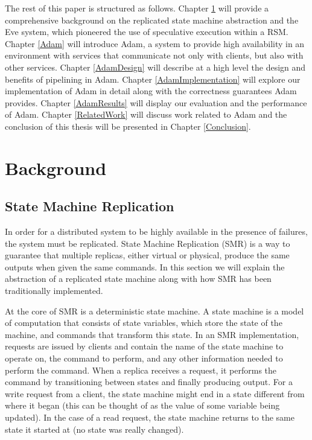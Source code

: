 \documentclass[11pt, oneside]{report}
\begin{document}
The rest of this paper is structured as follows. Chapter \ref{Background} will provide a comprehensive background on the replicated state machine abstraction and the Eve system, which pioneered the use of speculative execution within a RSM. Chapter \ref{Adam} will introduce Adam, a system to provide high availability in an environment with services that communicate not only with clients, but also with other services. Chapter \ref{AdamDesign} will describe at a high level the design and benefits of pipelining in Adam. Chapter \ref{AdamImplementation} will explore our implementation of Adam in detail along with the correctness guarantees Adam provides. Chapter \ref{AdamResults} will display our evaluation and the performance of Adam. Chapter \ref{RelatedWork} will discuss work related to Adam and the conclusion of this thesis will be presented in Chapter \ref{Conclusion}.

\chapter{Background}\label{Background}
\section{State Machine Replication}
In order for a distributed system to be highly available in the presence of failures, the system must be replicated. State Machine Replication (SMR) is a way to guarantee that multiple replicas, either virtual or physical, produce the same outputs when given the same commands. In this section we will explain the abstraction of a replicated state machine along with how SMR has been traditionally implemented.

At the core of SMR is a deterministic state machine. A state machine is a model of computation that consists of state variables, which store the state of the machine, and commands that transform this state. In an SMR implementation, requests are issued by clients and contain the name of the state machine to operate on, the command to perform, and any other information needed to perform the command. When a replica receives a request, it performs the command by transitioning between states and finally producing output. For a write request from a client, the state machine might end in a state different from where it began (this can be thought of as the value of some variable being updated). In the case of a read request, the state machine returns to the same state it started at (no state was really changed).
\end{document}
